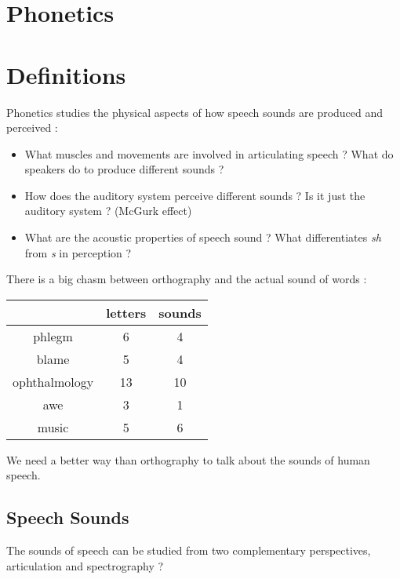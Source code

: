 \documentclass{cours}
\begin{document}
\section{Phonetics}
\section{Definitions}
Phonetics studies the physical aspects of how speech sounds are produced and perceived : 
\begin{itemize}
    \item What muscles and movements are involved in articulating speech ?  What do speakers do to produce different sounds ?
    \item How does the auditory system perceive different sounds ? Is it just the auditory system ? (McGurk effect)
    \item What are the acoustic properties of speech sound ? What differentiates \textsl{sh} from \textsl{s} in perception ? 
\end{itemize}

There is a big chasm between orthography and the actual sound of words :
\begin{center}
    \begin{tabular}{ccc}
        \toprule
        & letters & sounds\\
        \midrule
        phlegm & 6 & 4\\
        blame & 5 & 4\\
        ophthalmology & 13 & 10 \\
        awe & 3 & 1\\
        music & 5 & 6\\
        \bottomrule
    \end{tabular}
\end{center}
We need a better way than orthography to talk about the sounds of human speech.

\subsection{Speech Sounds}
The sounds of speech can be studied from two complementary perspectives, articulation and spectrography ? %
\end{document}
